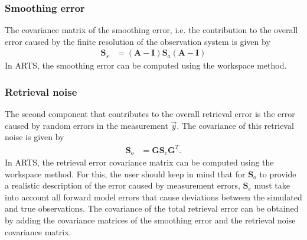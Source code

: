 \subsubsection{Smoothing error}

The covariance matrix of the smoothing error, i.e. the contribution
 to the overall error caused by the finite resolution of the observation
 system is given by
%
\begin{eqnarray}
\mathbf{S}_s &= (\mathbf{A} - \mathbf{I})\mathbf{S}_a(\mathbf{A} -\mathbf{I})
\end{eqnarray}
%
In ARTS, the smoothing error can be computed using the 
workspace method.

\subsubsection{Retrieval noise}

The second component that contributes to the overall retrieval error is
the error caused by random errors in the measurement $\vec{y}$.
  The covariance of this retrieval noise is given by
%
\begin{eqnarray}
\mathbf{S}_o &= \mathbf{G}\mathbf{S}_e\mathbf{G}^T.
\end{eqnarray}
%
In ARTS, the retrieval error covariance matrix can be computed using the
  workspace method. For this, the user should keep
in mind that for $\mathbf{S}_o$ to provide a realistic description of the
error caused by measurement errors, $\mathbf{S}_e$ must take into account all
forward model errors that cause deviations between the simulated and true
observations.  The covariance of the total retrieval error can be obtained
 by adding the covariance matrices of the smoothing error and the retrieval
 noise covariance matrix.
